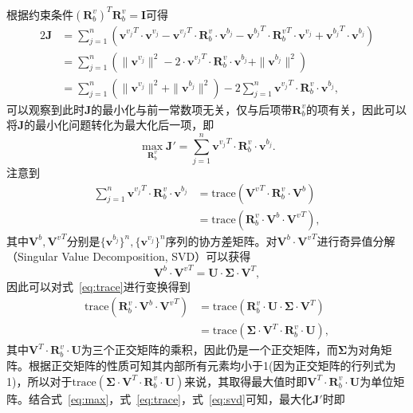 根据约束条件${(\symbf{R}_{b}^{v})}^T \symbf{R}_{b}^{v} = \symbf{I}$可得
\begin{align}
  2\symbf{J} &= \sum_{j=1}^{n} ({\symbf{v}^{v_{j}}}^T \cdot \symbf{v}^{v_{j}} - {\symbf{v}^{v_{j}}}^T \cdot \symbf{R}_{b}^{v} \cdot \symbf{v}^{b_{j}} - {\symbf{v}^{b_{j}}}^T \cdot {\symbf{R}_{b}^{v}}^T \cdot {\symbf{v}^{v_{j}}} + {\symbf{v}^{b_{j}}}^T \cdot \symbf{v}^{b_{j}}) \\ 
  &= \sum_{j=1}^{n} (\| \symbf{v}^{v_{j}} \|^2 - 2\cdot {\symbf{v}^{v_{j}}}^T \cdot \symbf{R}_{b}^{v} \cdot \symbf{v}^{b_{j}} + \| \symbf{v}^{b_{j}} \|^2) \\
  &= \sum_{j=1}^{n} (\| \symbf{v}^{v_{j}} \|^2 + \| \symbf{v}^{b_{j}} \|^2) - 2 \sum_{j=1}^{n} {\symbf{v}^{v_{j}}}^T \cdot \symbf{R}_{b}^{v} \cdot \symbf{v}^{b_{j}},
\end{align}
可以观察到此时$\symbf{J}$的最小化与前一常数项无关，仅与后项带$\symbf{R}_b^v$的项有关，因此可以将$\symbf{J}$的最小化问题转化为最大化后一项，即
\begin{equation}
  \max_{\symbf{R}_{b}^{v}} \symbf{J}' = \sum_{j=1}^{n} {\symbf{v}^{v_{j}}}^T \cdot \symbf{R}_{b}^{v} \cdot \symbf{v}^{b_{j}}.
\label{eq:max}
\end{equation}
注意到
\begin{align}
  \sum_{j=1}^{n} {\symbf{v}^{v_{j}}}^T \cdot \symbf{R}_{b}^{v} \cdot \symbf{v}^{b_{j}} &= \text{trace}({\symbf{V}^{v}}^T \cdot \symbf{R}_{b}^{v} \cdot \symbf{V}^{b}) \\ 
  &= \text{trace}( \symbf{R}_{b}^{v} \cdot \symbf{V}^{b} \cdot {\symbf{V}^{v}}^T), \label{eq:trace}
\end{align}
其中$\symbf{V}^{b}, {\symbf{V}^{v}}^T$分别是$\{\symbf{v}^{b_{j}}\}^n,\{\symbf{v}^{v_{j}}\}^n$序列的协方差矩阵。对$\symbf{V}^{b} \cdot {\symbf{V}^{v}}^T$进行奇异值分解（Singular Value Decomposition, SVD）可以获得
\begin{equation}
  \symbf{V}^{b} \cdot {\symbf{V}^{v}}^T = \symbf{U} \cdot \symbf{\Sigma} \cdot \symbf{V}^T,
\label{eq:svd}
\end{equation}
因此可以对式~\eqref{eq:trace}进行变换得到
\begin{align}
  \text{trace}( \symbf{R}_{b}^{v} \cdot \symbf{V}^{b} \cdot {\symbf{V}^{v}}^T) &= \text{trace}(\symbf{R}_{b}^{v} \cdot \symbf{U} \cdot \symbf{\Sigma} \cdot \symbf{V}^T) \\
  &= \text{trace}(\symbf{\Sigma} \cdot \symbf{V}^T \cdot \symbf{R}_{b}^{v} \cdot \symbf{U}),
\end{align}
其中$\symbf{V}^T \cdot \symbf{R}_{b}^{v} \cdot \symbf{U}$为三个正交矩阵的乘积，因此仍是一个正交矩阵，而$\symbf{\Sigma}$为对角矩阵。根据正交矩阵的性质可知其内部所有元素均小于1(因为正交矩阵的行列式为1)，所以对于$\text{trace}(\symbf{\Sigma} \cdot \symbf{V}^T \cdot \symbf{R}_{b}^{v} \cdot \symbf{U})$来说，其取得最大值时即$\symbf{V}^T \cdot \symbf{R}_{b}^{v} \cdot \symbf{U}$为单位矩阵。结合式~\eqref{eq:max}，式~\eqref{eq:trace}，式~\eqref{eq:svd}可知，最大化$\symbf{J}'$时即
